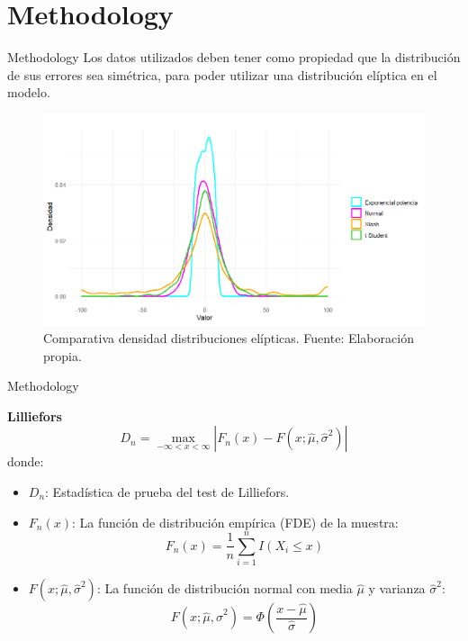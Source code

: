 \documentclass[10pt]{beamer}
\begin{document}
\section{Methodology}
\begin{frame}{Methodology}
        \justifying
        Los datos utilizados deben tener como propiedad que la distribución de sus errores sea simétrica, para poder utilizar una distribución elíptica en el modelo.\\
        
\begin{figure}[H]
\centering
\includegraphics[scale=0.45]{figuras/FIGURA_02_01}
{\footnotesize
\caption{Comparativa densidad distribuciones elípticas. Fuente: Elaboración propia.}
}
\label{figura01}
\end{figure}
\end{frame}

\begin{frame}{Methodology}

\textbf{Lilliefors}
    \begin{equation}
    D_n = \max_{-\infty < x < \infty} \left| F_n(x) - F(x; \hat{\mu}, \hat{\sigma}^2) \right|
    \end{equation}
    donde:
    \begin{itemize}
        \item \( D_n \): Estadística de prueba del test de Lilliefors.
        
        \item \( F_n(x) \): La función de distribución empírica (FDE) de la muestra:
        \[
        F_n(x) = \frac{1}{n} \sum_{i=1}^{n} I(X_i \leq x)
        \]
        
        \item \( F(x; \hat{\mu}, \hat{\sigma}^2) \): La función de distribución normal con media \( \hat{\mu} \) y varianza \( \hat{\sigma}^2 \):
        \[
        F(x; \hat{\mu}, \hat{\sigma}^2) = \Phi\left( \frac{x - \hat{\mu}}{\hat{\sigma}} \right)
        \]
    \end{itemize}
\end{frame}
\end{document}
